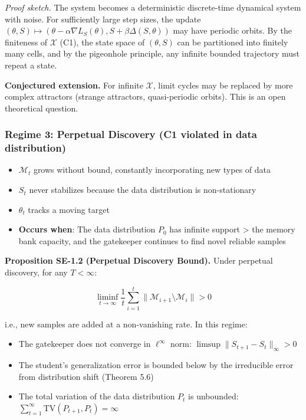 \documentclass[
  12pt,
]{article}
\providecommand{\tightlist}{%
  \setlength{\itemsep}{0pt}\setlength{\parskip}{0pt}}
\begin{document}
\emph{Proof sketch.} The system becomes a deterministic discrete-time
dynamical system with noise. For sufficiently large step sizes, the
update
\((\theta, S) \mapsto (\theta - \alpha \nabla L_S(\theta), S + \beta \Delta(S, \theta))\)
may have periodic orbits. By the finiteness of \(\mathcal{X}\) (C1), the
state space of \((\theta, S)\) can be partitioned into finitely many
cells, and by the pigeonhole principle, any infinite bounded trajectory
must repeat a state.

\textbf{Conjectured extension.} For infinite \(\mathcal{X}\), limit
cycles may be replaced by more complex attractors (strange attractors,
quasi-periodic orbits). This is an open theoretical question.

\subsubsection{Regime 3: Perpetual Discovery (C1 violated in data
distribution)}\label{regime-3-perpetual-discovery-c1-violated-in-data-distribution}

\begin{itemize}
\tightlist
\item
  \(\mathcal{M}_t\) grows without bound, constantly incorporating new
  types of data
\item
  \(S_t\) never stabilizes because the data distribution is
  non-stationary
\item
  \(\theta_t\) tracks a moving target
\item
  \textbf{Occurs when}: The data distribution \(P_0\) has infinite
  support \textgreater{} the memory bank capacity, and the gatekeeper
  continues to find novel reliable samples
\end{itemize}

\textbf{Proposition SE-1.2 (Perpetual Discovery Bound).} Under perpetual
discovery, for any \(T < \infty\):

\[
\liminf_{t \to \infty} \frac{1}{t} \sum_{i=1}^t \|\mathcal{M}_{i+1} \setminus \mathcal{M}_i\| > 0
\]

i.e., new samples are added at a non-vanishing rate. In this regime:

\begin{itemize}
\tightlist
\item
  The gatekeeper does not converge in \(\ell^\infty\) norm:
  \(\limsup \|S_{t+1} - S_t\|_\infty > 0\)
\item
  The student's generalization error is bounded below by the irreducible
  error from distribution shift (Theorem 5.6)
\item
  The total variation of the data distribution \(P_t\) is unbounded:
  \(\sum_{t=1}^\infty \text{TV}(P_{t+1}, P_t) = \infty\)
\end{itemize}
\end{document}
